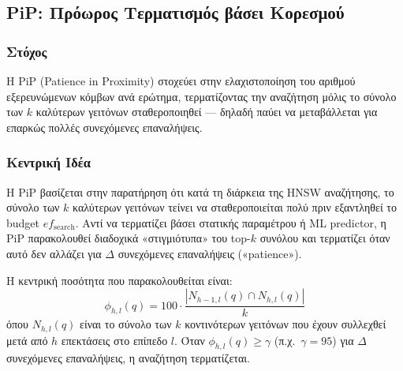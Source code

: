 \documentclass[12pt,a4paper]{article}
\begin{document}
\subsection{PiP: Πρόωρος Τερματισμός βάσει Κορεσμού}

\subsubsection*{Στόχος}
Η PiP (Patience in Proximity) \cite{pip2025} στοχεύει στην ελαχιστοποίηση του αριθμού εξερευνώμενων κόμβων ανά ερώτημα, τερματίζοντας την αναζήτηση μόλις το σύνολο των $k$ καλύτερων γειτόνων σταθεροποιηθεί --- δηλαδή παύει να μεταβάλλεται για επαρκώς πολλές συνεχόμενες επαναλήψεις.

\subsubsection*{Κεντρική Ιδέα}
Η PiP βασίζεται στην παρατήρηση ότι κατά τη διάρκεια της HNSW αναζήτησης, το σύνολο των $k$ καλύτερων γειτόνων τείνει να σταθεροποιείται πολύ πριν εξαντληθεί το budget $ef_{\text{search}}$. Αντί να τερματίζει βάσει στατικής παραμέτρου ή ML predictor, η PiP παρακολουθεί διαδοχικά «στιγμιότυπα» του top-$k$ συνόλου και τερματίζει όταν αυτό δεν αλλάζει για $\Delta$ συνεχόμενες επαναλήψεις («patience»).

Η κεντρική ποσότητα που παρακολουθείται είναι:
\begin{equation}
    \phi_{h,l}(q) = 100 \cdot \frac{|N_{h-1,l}(q) \cap N_{h,l}(q)|}{k}
\end{equation}
όπου $N_{h,l}(q)$ είναι το σύνολο των $k$ κοντινότερων γειτόνων που έχουν συλλεχθεί μετά από $h$ επεκτάσεις στο επίπεδο $l$. Όταν $\phi_{h,l}(q) \geq \gamma$ (π.χ.\ $\gamma = 95$) για $\Delta$ συνεχόμενες επαναλήψεις, η αναζήτηση τερματίζεται.
\end{document}
